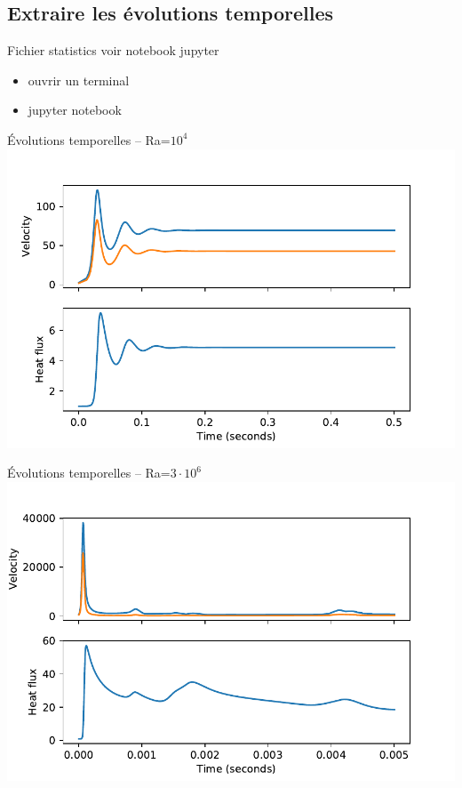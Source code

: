 \documentclass[9pt]{beamer}
\begin{document}
\subsection{Extraire les évolutions temporelles}

\begin{frame}{Fichier statistics}
    voir notebook jupyter
    
    \begin{itemize}
        \item ouvrir un terminal
        \item jupyter notebook
    \end{itemize}
\end{frame}

\begin{frame}{Évolutions temporelles -- Ra=$10^4$}
    \includegraphics[width=\textwidth]{fig/evolution_temporelle_Ra1e4.pdf}
\end{frame}

\begin{frame}{Évolutions temporelles -- Ra=$3\cdot 10^6$}
    \includegraphics[width=\textwidth]{fig/evolution_temporelle_Ra3e6.pdf}
\end{frame}
\end{document}
